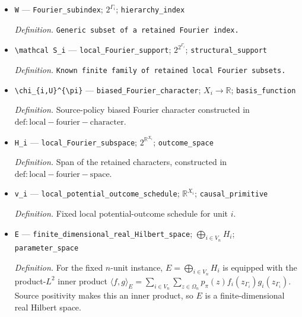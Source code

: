 \documentclass{article}
\begin{document}
\begin{itemize}
  \par\smallskip\noindent\emph{Definition.} \texttt{Generic local Fourier subset.}
  \item \texttt{W} --- \texttt{Fourier\_\allowbreak{}subindex}; \(2^{\Gamma_i}\); \texttt{hierarchy\_\allowbreak{}index}
  \par\smallskip\noindent\emph{Definition.} \texttt{Generic subset of a retained Fourier index.}
  \item \texttt{\textbackslash{}\allowbreak{}mathcal S\_\allowbreak{}i} --- \texttt{local\_\allowbreak{}Fourier\_\allowbreak{}support}; \(2^{2^{\Gamma_i}}\); \texttt{structural\_\allowbreak{}support}
  \par\smallskip\noindent\emph{Definition.} \texttt{Known finite family of retained local Fourier subsets.}
  \item \texttt{\textbackslash{}\allowbreak{}chi\_\allowbreak{}\{i,\allowbreak{}U\}\allowbreak{}\textasciicircum{}\{\textbackslash{}\allowbreak{}pi\}\allowbreak{}} --- \texttt{biased\_\allowbreak{}Fourier\_\allowbreak{}character}; \(X_i\to\mathbb R\); \texttt{basis\_\allowbreak{}function}
  \par\smallskip\noindent\emph{Definition.} Source-policy biased Fourier character constructed in \(\mathrm{def:local-fourier-character}\).
  \item \texttt{H\_\allowbreak{}i} --- \texttt{local\_\allowbreak{}Fourier\_\allowbreak{}subspace}; \(2^{\mathbb R^{X_i}}\); \texttt{outcome\_\allowbreak{}space}
  \par\smallskip\noindent\emph{Definition.} Span of the retained characters, constructed in \(\mathrm{def:local-fourier-space}\).
  \item \texttt{v\_\allowbreak{}i} --- \texttt{local\_\allowbreak{}potential\_\allowbreak{}outcome\_\allowbreak{}schedule}; \(\mathbb R^{X_i}\); \texttt{causal\_\allowbreak{}primitive}
  \par\smallskip\noindent\emph{Definition.} Fixed local potential-outcome schedule for unit \(i\).
  \item \texttt{E} --- \texttt{finite\_\allowbreak{}dimensional\_\allowbreak{}real\_\allowbreak{}Hilbert\_\allowbreak{}space}; \(\bigoplus_{i\in V_n}H_i\); \texttt{parameter\_\allowbreak{}space}
  \par\smallskip\noindent\emph{Definition.} For the fixed \(n\)-unit instance, \(E=\bigoplus_{i\in V_n}H_i\) is equipped with the product-\(L^2\) inner product \(\langle f,g\rangle_E=\sum_{i\in V_n}\sum_{z\in\Omega_n}p_{\pi}(z)f_i(z_{\Gamma_i})g_i(z_{\Gamma_i})\). Source positivity makes this an inner product, so \(E\) is a finite-dimensional real Hilbert space.

\end{itemize}
\end{document}
